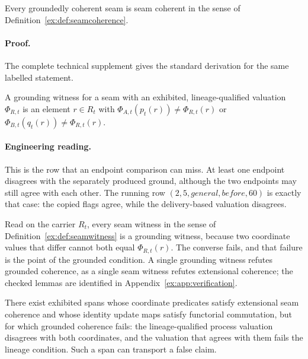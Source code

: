 \documentclass[twocolumn,envcountsect,envcountsame,natbib]{svjour3}
\begin{document}
\begin{proposition}\label{ex:prop:grounding-entails-coherence}
Every groundedly coherent seam is seam coherent in the sense of Definition~\ref{ex:def:seamcoherence}.
\end{proposition}

\paragraph{Proof.} The complete technical supplement gives the standard derivation for the same labelled statement.

\begin{definition}\label{ex:def:grounding-witness}
A grounding witness for a seam with an exhibited, lineage-qualified valuation $\Phi_{R,t}$ is an element $r\in R_t$ with $\Phi_{A,t}(p_t(r))\neq\Phi_{R,t}(r)$ or $\Phi_{B,t}(q_t(r))\neq\Phi_{R,t}(r)$.
\end{definition}

\paragraph{Engineering reading.} This is the row that an endpoint comparison can miss. At least one endpoint disagrees with the separately produced ground, although the two endpoints may still agree with each other. The running row $(2,5,\mathit{general},\mathit{before},60)$ is exactly that case: the copied flags agree, while the delivery-based valuation disagrees.

Read on the carrier $R_t$, every seam witness in the sense of Definition~\ref{ex:def:seamwitness} is a grounding witness, because two coordinate values that differ cannot both equal $\Phi_{R,t}(r)$. The converse fails, and that failure is the point of the grounded condition. A single grounding witness refutes grounded coherence, as a single seam witness refutes extensional coherence; the checked lemmas are identified in Appendix~\ref{ex:app:verification}.

\begin{proposition}\label{ex:prop:ungrounded-agreement}
There exist exhibited spans whose coordinate predicates satisfy extensional seam coherence and whose identity update maps satisfy functorial commutation, but for which grounded coherence fails: the lineage-qualified process valuation disagrees with both coordinates, and the valuation that agrees with them fails the lineage condition. Such a span can transport a false claim.
\end{proposition}
\end{document}
